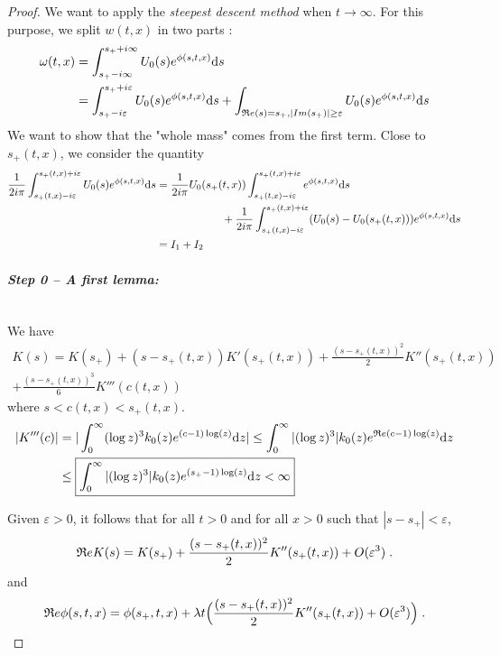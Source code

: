 \documentclass[11pt]{amsart}
\renewcommand{\Re}{\mathfrak{R}e}
\begin{document}
\begin{proof}
We want to apply the \textit{steepest descent method} \cite{debye1909naherungsformeln} when $t \to \infty$. For this purpose, we split $w(t,x)$ in two parts : 
\begin{align*}
    \omega(t,x)
        &= \int_{s_+-i\infty}^{s_++i\infty} U_0(s)e^{\phi(s, t, x)} \ds \\
        &= \int_{s_+-i\varepsilon}^{s_++i\varepsilon} U_0(s) e^{\phi(s, t, x)} \ds 
        +\int_{\Re(s) = s_+, |Im(s_+)| \geq \varepsilon} U_0(s) e^{\phi(s, t, x)} \ds \\
\end{align*}
We want to show that the "whole mass" comes from the first term. Close to $s_+(t,x)$, we consider the quantity
    \begin{align*}
    \frac{1}{2i \pi} \int_{s_+(t,x) - i\varepsilon}^{s_+(t,x) + i\varepsilon} U_0(s) e^{\phi(s,t,x)} \mathrm ds 
    &=
    \frac{1}{2i \pi} U_0(s_+(t,x)) \int_{s_+(t,x) - i\varepsilon}^{s_+(t,x) + i\varepsilon} e^{\phi(s,t,x)} \mathrm ds
    \\
    & \qquad \qquad \qquad+ 
    \frac{1}{2i \pi} \int_{s_+(t,x) - i\varepsilon}^{s_+(t,x) + i\varepsilon} (U_0(s) -  U_0(s_+(t,x)))  e^{\phi(s,t,x)} \mathrm ds \\
    &= I_1 + I_2
    \end{align*}

\paragraph{\textit{Step 0 -- A first lemma:}}\mbox{}\\
We have
\begin{equation}
    \begin{split}
    K(s) = K(s_+) + (s - s_+(t,x)) K'(s_+(t,x)) + \frac{(s - s_+(t,x))^2}{2} K''(s_+(t,x)) \\+ \frac{(s - s_+(t,x))^3}{6} K'''(c(t,x))
    \end{split}
\end{equation}
where $s < c(t,x) < s_+(t,x)$.
    \begin{align*}
         |K'''(c)|
         &= |\int_0^\infty (\log z)^3 k_0(z) e^{(c-1)\log(z)}\dz|
         \leq \int_0^\infty |(\log z)^3| k_0(z)  e^{\Re (c-1)\log(z)}\dz \\
         &\leq  \boxed{\int_0^\infty |(\log z)^3| k_0(z)  e^{(s_+-1)\log(z)}\dz < \infty}
    \end{align*}
    
Given $\varepsilon > 0$, it follows that for all $t > 0$ and for all $x>0$ such that $|s - s_+| < \varepsilon$, 
    \begin{equation}
        \begin{split}
        \Re K(s) = K(s_+) + \frac{(s - s_+(t,x))^2}{2} K''(s_+(t,x)) + O(\varepsilon^3)
        \eqfinp
        \end{split}
    \end{equation}
and 
    \begin{equation}
        \Re \phi(s, t, x) = \phi(s_+, t, x) + \lambda t \Big(\frac{(s - s_+(t,x))^2}{2} K''(s_+(t,x)) + O(\varepsilon^3)\Big)
        \eqfinp
    \end{equation}
\medskip


\end{proof}
\end{document}

